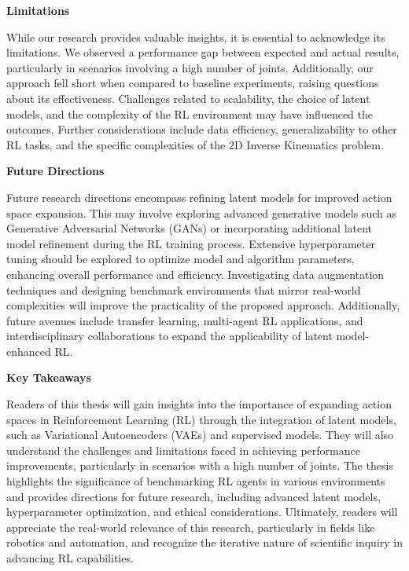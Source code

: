 \textbf{Limitations}

While our research provides valuable insights, it is essential to acknowledge its limitations. We observed a performance gap between expected and actual results, particularly in scenarios involving a high number of joints. Additionally, our approach fell short when compared to baseline experiments, raising questions about its effectiveness. Challenges related to scalability, the choice of latent models, and the complexity of the RL environment may have influenced the outcomes. Further considerations include data efficiency, generalizability to other RL tasks, and the specific complexities of the 2D Inverse Kinematics problem.

\textbf{Future Directions}

Future research directions encompass refining latent models for improved action space expansion. This may involve exploring advanced generative models such as Generative Adversarial Networks (GANs) or incorporating additional latent model refinement during the RL training process. Extensive hyperparameter tuning should be explored to optimize model and algorithm parameters, enhancing overall performance and efficiency. Investigating data augmentation techniques and designing benchmark environments that mirror real-world complexities will improve the practicality of the proposed approach. Additionally, future avenues include transfer learning, multi-agent RL applications, and interdisciplinary collaborations to expand the applicability of latent model-enhanced RL.

\textbf{Key Takeaways}

Readers of this thesis will gain insights into the importance of expanding action spaces in Reinforcement Learning (RL) through the integration of latent models, such as Variational Autoencoders (VAEs) and supervised models. They will also understand the challenges and limitations faced in achieving performance improvements, particularly in scenarios with a high number of joints. The thesis highlights the significance of benchmarking RL agents in various environments and provides directions for future research, including advanced latent models, hyperparameter optimization, and ethical considerations. Ultimately, readers will appreciate the real-world relevance of this research, particularly in fields like robotics and automation, and recognize the iterative nature of scientific inquiry in advancing RL capabilities.
